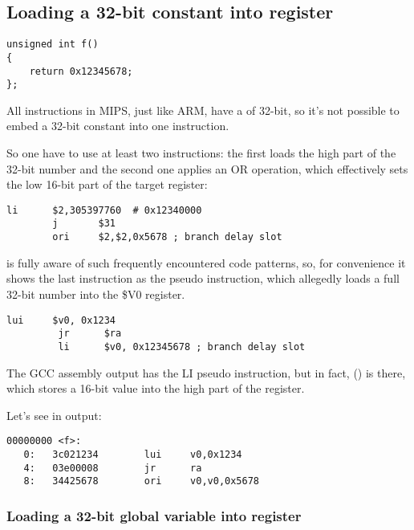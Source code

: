 ﻿\subsection{Loading a 32-bit constant into register}
\label{MIPS_big_constants}

\begin{lstlisting}
unsigned int f()
{
	return 0x12345678;
};
\end{lstlisting}

All instructions in MIPS, just like ARM, have a of 32-bit, so it's not possible to
embed a 32-bit constant into one instruction.

So one have to use at least two instructions: 
the first loads the high part of the 32-bit number and the second
one applies an OR operation, which effectively sets the low 16-bit part of the target register:

\begin{lstlisting}[caption=GCC 4.4.5 -O3 (\assemblyOutput)]
        li      $2,305397760  # 0x12340000
        j       $31
        ori     $2,$2,0x5678 ; branch delay slot
\end{lstlisting}

\IDA is fully aware of such frequently encountered code patterns, 
so, for convenience it shows the last  instruction as the  pseudo instruction,
which allegedly loads a full 32-bit number into the \$V0 register.


\begin{lstlisting}[caption=GCC 4.4.5 -O3 (IDA)]
         lui     $v0, 0x1234
         jr      $ra
         li      $v0, 0x12345678 ; branch delay slot
\end{lstlisting}

The GCC assembly output has the LI pseudo instruction, but in fact,  () is there,
which stores a 16-bit value into the high part of the register.

Let's see in  output:

\begin{lstlisting}[caption=objdump]
00000000 <f>:
   0:   3c021234        lui     v0,0x1234
   4:   03e00008        jr      ra
   8:   34425678        ori     v0,v0,0x5678
\end{lstlisting}

\subsubsection{Loading a 32-bit global variable into register}


